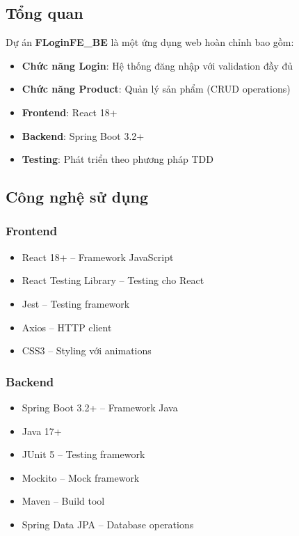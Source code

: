 \documentclass[a4paper,12pt]{article}
\begin{document}
\subsection{Tổng quan}

Dự án \textbf{FLoginFE\_BE} là một ứng dụng web hoàn chỉnh bao gồm:
\begin{itemize}
    \item \textbf{Chức năng Login}: Hệ thống đăng nhập với validation đầy đủ
    \item \textbf{Chức năng Product}: Quản lý sản phẩm (CRUD operations)
    \item \textbf{Frontend}: React 18+
    \item \textbf{Backend}: Spring Boot 3.2+
    \item \textbf{Testing}: Phát triển theo phương pháp TDD
\end{itemize}

\subsection{Công nghệ sử dụng}

\subsubsection{Frontend}
\begin{itemize}
    \item React 18+ -- Framework JavaScript
    \item React Testing Library -- Testing cho React
    \item Jest -- Testing framework
    \item Axios -- HTTP client
    \item CSS3 -- Styling với animations
\end{itemize}

\subsubsection{Backend}
\begin{itemize}
    \item Spring Boot 3.2+ -- Framework Java
    \item Java 17+
    \item JUnit 5 -- Testing framework
    \item Mockito -- Mock framework
    \item Maven -- Build tool
    \item Spring Data JPA -- Database operations
\end{itemize}
\end{document}
